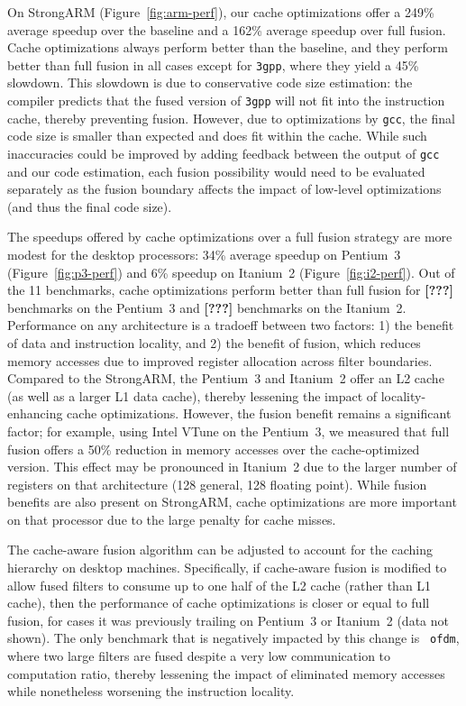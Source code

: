 On StrongARM (Figure~\ref{fig:arm-perf}), our cache optimizations
offer a 249\% average speedup over the baseline and a 162\%
average speedup over full fusion.  Cache optimizations always perform
better than the baseline, and they perform better than full fusion in
all cases except for \texttt{3gpp}, where they yield a 45\% slowdown.
This slowdown is due to conservative code size estimation: the
compiler predicts that the fused version of \texttt{3gpp} will not fit
into the instruction cache, thereby preventing fusion.  However, due
to optimizations by {\tt gcc}, the final code size is smaller than
expected and does fit within the cache.  While such inaccuracies could
be improved by adding feedback between the output of {\tt gcc} and our
code estimation, each fusion possibility would need to be evaluated
separately as the fusion boundary affects the impact of low-level
optimizations (and thus the final code size).

The speedups offered by cache optimizations over a full fusion
strategy are more modest for the desktop processors: 34\% average
speedup on Pentium~3 (Figure~\ref{fig:p3-perf}) and 6\% speedup on
Itanium~2 (Figure~\ref{fig:i2-perf}).  Out of the 11 benchmarks, cache
optimizations perform better than full fusion for {\bf [???]}
benchmarks on the Pentium~3 and {\bf [???]} benchmarks on the
Itanium~2.  Performance on any architecture is a tradoeff between two
factors: 1) the benefit of data and instruction locality, and 2) the
benefit of fusion, which reduces memory accesses due to improved
register allocation across filter boundaries.  Compared to the
StrongARM, the Pentium~3 and Itanium~2 offer an L2 cache (as well as a
larger L1 data cache), thereby lessening the impact of
locality-enhancing cache optimizations.  However, the fusion benefit
remains a significant factor; for example, using Intel VTune on the
Pentium~3, we measured that full fusion offers a 50\% reduction in
memory accesses over the cache-optimized version.  This effect may be
pronounced in Itanium~2 due to the larger number of registers on that
architecture (128 general, 128 floating point).  While fusion benefits
are also present on StrongARM, cache optimizations are more important
on that processor due to the large penalty for cache misses.

The cache-aware fusion algorithm can be adjusted to account for the
caching hierarchy on desktop machines.  Specifically, if cache-aware
fusion is modified to allow fused filters to consume up to one half of
the L2 cache (rather than L1 cache), then the performance of cache
optimizations is closer or equal to full fusion, for cases it was
previously trailing on Pentium~3 or Itanium~2 (data not shown).  The
only benchmark that is negatively impacted by this change is {\tt
ofdm}, where two large filters are fused despite a very low
communication to computation ratio, thereby lessening the impact of
eliminated memory accesses while nonetheless worsening the instruction
locality.


